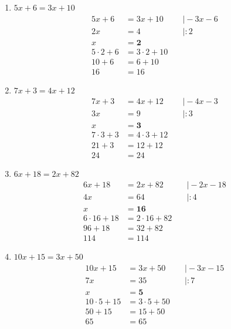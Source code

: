 \documentclass[a4paper,10pt]{article} %
\begin{document}
\begin{enumerate}[label=\alph*)]

  \item \(5x + 6 = 3x + 10\)
  \[
  \begin{aligned}
    5x + 6 &= 3x + 10 &\quad\big| -3x - 6 \\
    2x &= 4 &\quad\big| : 2 \\
    x &= \mathbf{2} \\
    5 \cdot 2 + 6 &= 3 \cdot 2 + 10 \\
    10 + 6 &= 6 + 10 \\
    16 &= 16
  \end{aligned}
  \]

  \item \(7x + 3 = 4x + 12\)
  \[
  \begin{aligned}
    7x + 3 &= 4x + 12 &\quad\big| -4x - 3 \\
    3x &= 9 &\quad\big| : 3 \\
    x &= \mathbf{3} \\
    7 \cdot 3 + 3 &= 4 \cdot 3 + 12 \\
    21 + 3 &= 12 + 12 \\
    24 &= 24
  \end{aligned}
  \]

  \item \(6x + 18 = 2x + 82\)
  \[
  \begin{aligned}
    6x + 18 &= 2x + 82 &\quad\big| -2x - 18 \\
    4x &= 64 &\quad\big| : 4 \\
    x &= \mathbf{16} \\
    6 \cdot 16 + 18 &= 2 \cdot 16 + 82 \\
    96 + 18 &= 32 + 82 \\
    114 &= 114
  \end{aligned}
  \]

  \item \(10x + 15 = 3x + 50\)
  \[
  \begin{aligned}
    10x + 15 &= 3x + 50 &\quad\big| -3x - 15 \\
    7x &= 35 &\quad\big| : 7 \\
    x &= \mathbf{5} \\
    10 \cdot 5 + 15 &= 3 \cdot 5 + 50 \\
    50 + 15 &= 15 + 50 \\
    65 &= 65
  \end{aligned}
  \]


\end{enumerate}
\end{document}
